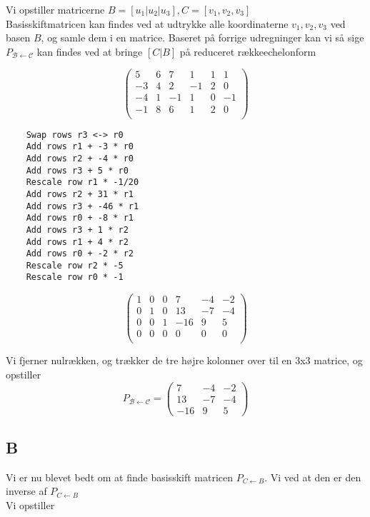 \documentclass[11pt]{article}
\begin{document}
    Vi opstiller matricerne \(B = [u_1|u_2|u_3], C = [v_1,v_2,v_3]\)\\
Basisskiftmatricen kan findes ved at udtrykke alle koordinaterne
\(v_1,v_2,v_3\) ved basen \(B\), og samle dem i en matrice. Baseret på
forrige udregninger kan vi så sige
\(P_{\mathcal{B}\leftarrow\mathcal{C}}\) kan findes ved at bringe
\([C|B]\) på reduceret rækkeechelonform

\[ \left(\begin{array}{rrrrrr}
         5 & 6 & 7 & 1 & 1 & 1 \\
         -3 & 4 & 2 & -1 & 2 & 0 \\
         -4 & 1 & -1 & 1 & 0 & -1 \\
         -1 & 8 & 6 & 1 & 2 & 0\\
 \end{array}\right) \]

\begin{Verbatim}
	Swap rows r3 <-> r0
	Add rows r1 + -3 * r0
	Add rows r2 + -4 * r0
	Add rows r3 + 5 * r0
	Rescale row r1 * -1/20
	Add rows r2 + 31 * r1
	Add rows r3 + -46 * r1
	Add rows r0 + -8 * r1
	Add rows r3 + 1 * r2
	Add rows r1 + 4 * r2
	Add rows r0 + -2 * r2
	Rescale row r2 * -5
	Rescale row r0 * -1
\end{Verbatim}

\[ \left(\begin{array}{rrrrrr}
         1 & 0 & 0 & 7 & -4 & -2 \\
         0 & 1 & 0 & 13 & -7 & -4 \\
         0 & 0 & 1 & -16 & 9 & 5 \\
         0 & 0 & 0 & 0 & 0 & 0\\
\end{array}\right) \]
            
Vi fjerner nulrækken, og trækker de tre højre kolonner over til en 3x3
matrice, og opstiller
\[ P_{\mathcal{B}\leftarrow\mathcal{C}} = \left(\begin{array}{rrr}
7 & -4 & -2 \\
13 & -7 & -4 \\
-16 & 9 & 5
\end{array}\right) \]

    \hypertarget{b2}{%
\subsection{B}\label{b2}}

Vi er nu blevet bedt om at finde basisskift matricen
\(P_{C\leftarrow B}\). Vi ved at den er den inverse af
\(P_{C\leftarrow B}\)\\
Vi opstiller
\end{document}
